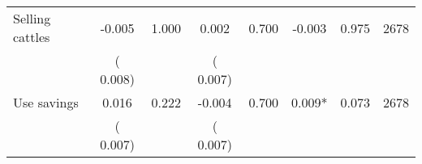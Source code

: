 \begin{tabular}{l*{7}{c}}
 Selling cattles       &             -0.005       &        1.000  &              0.002       &        0.700  &             -0.003       &              0.975 &  2678 \\ 
                       &       (       0.008)             &                               &       (       0.007)                     &                               &                                               &                                &                      \\ 

 Use savings       &              0.016       &        0.222  &             -0.004       &        0.700  &              0.009*       &              0.073 &  2678 \\ 
                       &       (       0.007)             &                               &       (       0.007)                     &                               &                                               &                                &                      \\ 

\hline \end{tabular}